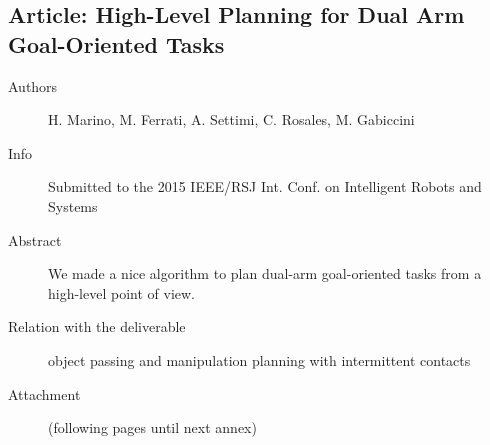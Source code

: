 \documentclass[a4paper,11pt,pdf]{pacmanreport}
\begin{document}
%

\subsection{Article: High-Level Planning for Dual Arm Goal-Oriented Tasks} \label{ann:dualArmPlanning}
\begin{description}
    \item[Authors] H. Marino, M. Ferrati, A. Settimi, C. Rosales, M. Gabiccini
    \item[Info] Submitted to the 2015 IEEE/RSJ Int. Conf. on Intelligent Robots and Systems
    \item[Abstract] We made a nice algorithm to plan dual-arm goal-oriented tasks from a high-level point of view.
    \item[Relation with the deliverable] object passing and manipulation planning with intermittent contacts
    \item[Attachment] (following pages until next annex)
\end{description}
%
\end{document}
